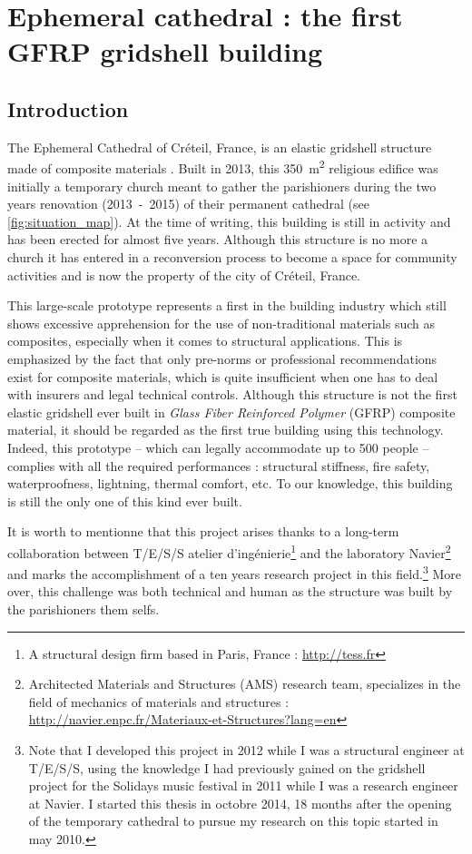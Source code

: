 
\chapter{Ephemeral cathedral : the first GFRP gridshell building}

\section{Introduction}

The Ephemeral Cathedral of Créteil, France, is an elastic gridshell structure made of composite materials \cite{DuPeloux2016}. Built in 2013, this \SI{350}{m^2} religious edifice was initially a temporary church meant to gather the parishioners during the two years renovation (2013~-~2015) of their permanent cathedral (see \cref{fig:situation_map}). At the time of writing, this building is still in activity and has been erected for almost five years. Although this structure is no more a church it has entered in a reconversion process to become a space for community activities and is now the property of the city of Créteil, France.

This large-scale prototype represents a first in the building industry which still shows excessive apprehension for the use of non-traditional materials such as composites, especially when it comes to structural applications. This is emphasized by the fact that only pre-norms or professional recommendations exist for composite materials, which is quite insufficient when one has to deal with insurers and legal technical controls.
Although this structure is not the first elastic gridshell ever built in \emph{Glass Fiber Reinforced Polymer} (GFRP) composite material, it should be regarded as the first true building using this technology. Indeed, this prototype -- which can legally accommodate up to 500 people -- complies with all the required performances : structural stiffness, fire safety, waterproofness, lightning, thermal comfort, etc. To our knowledge, this building is still the only one of this kind ever built.

It is worth to mentionne that this project arises thanks to a long-term collaboration between {T/E/S/S atelier d'ingénierie}\footnote{A structural design firm based in Paris, France : \url{http://tess.fr}} and the laboratory Navier\footnote{Architected Materials and Structures (AMS) research team, specializes in the field of mechanics of materials and structures : \url{http://navier.enpc.fr/Materiaux-et-Structures?lang=en}} and marks the accomplishment of a ten years research project in this field.\footnote{Note that I developed this project in 2012 while I was a structural engineer at T/E/S/S, using the knowledge I had previously gained on the gridshell project for the Solidays music festival in 2011 while I was a research engineer at Navier. I started this thesis in octobre 2014, 18 months after the opening of the temporary cathedral to pursue my research on this topic started in may 2010.} More over, this challenge was both technical and human as the structure was built by the parishioners them selfs.

